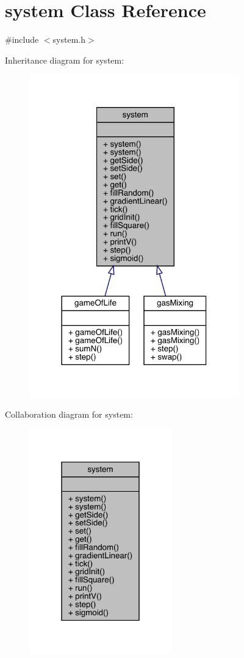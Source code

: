 \hypertarget{classsystem}{}\section{system Class Reference}
\label{classsystem}


{\ttfamily \#include $<$system.\+h$>$}



Inheritance diagram for system\+:
\nopagebreak
\begin{figure}[H]
\begin{center}
\leavevmode
\includegraphics[width=258pt]{classsystem__inherit__graph}
\end{center}
\end{figure}


Collaboration diagram for system\+:
\nopagebreak
\begin{figure}[H]
\begin{center}
\leavevmode
\includegraphics[width=175pt]{classsystem__coll__graph}
\end{center}
\end{figure}
